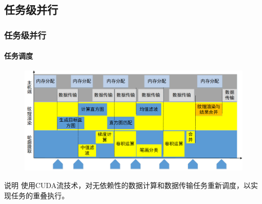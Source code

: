 \documentclass[aspectratio=43, xcolor=svgnames, t, 10pt]{beamer}
\begin{document}
\subsection{任务级并行}
\begin{frame}
  \frametitle{任务级并行}
  \framesubtitle{任务调度}
  \begin{figure}
    \includegraphics[width=\linewidth]{./figure/task_schedule.png}
  \end{figure}
  \begin{block}{说明}
    使用\textrm{CUDA}流技术，对无依赖性的数据计算和数据传输任务重新调度，以实现任务的重叠执行。
  \end{block}
\end{frame}
\end{document}
